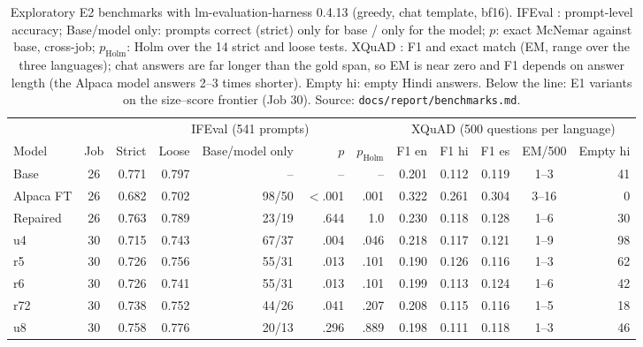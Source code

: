 \begin{table}[t]
\centering\footnotesize
\setlength{\tabcolsep}{4pt}
\begin{tabular}{@{}l c r r r r r r r r c r@{}}
\toprule
& & \multicolumn{5}{c}{IFEval (541 prompts)} & \multicolumn{5}{c}{XQuAD (500 questions per language)} \\
\cmidrule(lr){3-7}\cmidrule(l){8-12}
Model & Job & Strict & Loose & Base/model only & $p$ & $p_{\text{Holm}}$ & F1 en & F1 hi & F1 es & EM/500 & Empty hi \\
\midrule
Base & 26 & 0.771 & 0.797 & -- & -- & -- & 0.201 & 0.112 & 0.119 & 1--3 & 41 \\
Alpaca FT & 26 & 0.682 & 0.702 & 98/50 & $<$.001 & .001 & 0.322 & 0.261 & 0.304 & 3--16 & 0 \\
Repaired & 26 & 0.763 & 0.789 & 23/19 & .644 & 1.0 & 0.230 & 0.118 & 0.128 & 1--6 & 30 \\
\midrule
u4 & 30 & 0.715 & 0.743 & 67/37 & .004 & .046 & 0.218 & 0.117 & 0.121 & 1--9 & 98 \\
r5 & 30 & 0.726 & 0.756 & 55/31 & .013 & .101 & 0.190 & 0.126 & 0.116 & 1--3 & 62 \\
r6 & 30 & 0.726 & 0.741 & 55/31 & .013 & .101 & 0.199 & 0.113 & 0.124 & 1--6 & 42 \\
r72 & 30 & 0.738 & 0.752 & 44/26 & .041 & .207 & 0.208 & 0.115 & 0.116 & 1--5 & 18 \\
u8 & 30 & 0.758 & 0.776 & 20/13 & .296 & .889 & 0.198 & 0.111 & 0.118 & 1--3 & 46 \\
\bottomrule
\end{tabular}
\caption{Exploratory E2 benchmarks with lm-evaluation-harness 0.4.13 \citep{biderman2024lessons,lmeval2026software} (greedy, chat template, bf16). IFEval \citep{zhou2023ifeval}: prompt-level accuracy; Base/model only: prompts correct (strict) only for base / only for the model; $p$: exact McNemar against base, cross-job; $p_{\text{Holm}}$: Holm over the 14 strict and loose tests. XQuAD \citep{artetxe2019xquad}: F1 and exact match (EM, range over the three languages); chat answers are far longer than the gold span, so EM is near zero and F1 depends on answer length (the Alpaca model answers 2--3 times shorter). Empty hi: empty Hindi answers. Below the line: E1 variants on the size--score frontier (Job 30). Source: \texttt{docs/report/benchmarks.md}.}
\label{tab:bench}
\end{table}
